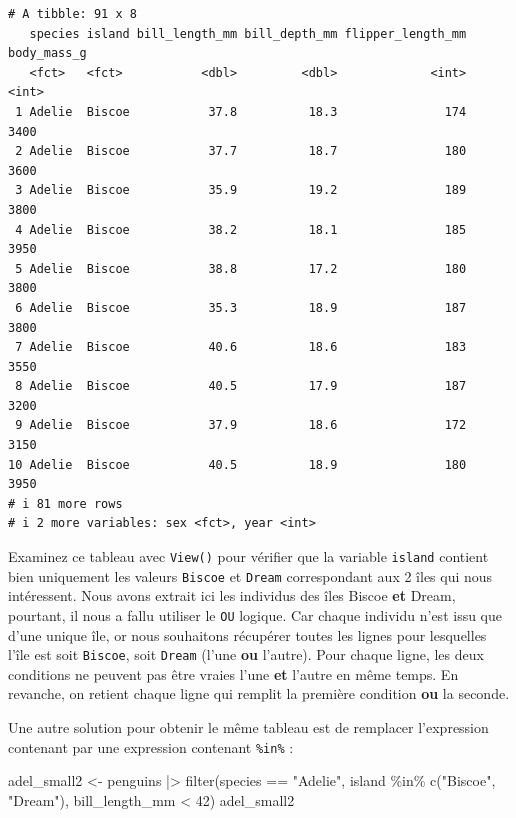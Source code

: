 \documentclass[
  a4paper,
  DIV=11,
  numbers=noendperiod,
  oneside]{scrreprt}
\newenvironment{Shaded}{}{}
\newcommand{\DecValTok}[1]{\textcolor[rgb]{0.00,0.36,0.77}{#1}}
\newcommand{\FunctionTok}[1]{\textcolor[rgb]{0.44,0.26,0.76}{#1}}
\newcommand{\NormalTok}[1]{\textcolor[rgb]{0.14,0.16,0.18}{#1}}
\newcommand{\OtherTok}[1]{\textcolor[rgb]{0.44,0.26,0.76}{#1}}
\newcommand{\SpecialCharTok}[1]{\textcolor[rgb]{0.00,0.36,0.77}{#1}}
\newcommand{\StringTok}[1]{\textcolor[rgb]{0.01,0.18,0.38}{#1}}
\begin{document}
\begin{verbatim}
# A tibble: 91 x 8
   species island bill_length_mm bill_depth_mm flipper_length_mm body_mass_g
   <fct>   <fct>           <dbl>         <dbl>             <int>       <int>
 1 Adelie  Biscoe           37.8          18.3               174        3400
 2 Adelie  Biscoe           37.7          18.7               180        3600
 3 Adelie  Biscoe           35.9          19.2               189        3800
 4 Adelie  Biscoe           38.2          18.1               185        3950
 5 Adelie  Biscoe           38.8          17.2               180        3800
 6 Adelie  Biscoe           35.3          18.9               187        3800
 7 Adelie  Biscoe           40.6          18.6               183        3550
 8 Adelie  Biscoe           40.5          17.9               187        3200
 9 Adelie  Biscoe           37.9          18.6               172        3150
10 Adelie  Biscoe           40.5          18.9               180        3950
# i 81 more rows
# i 2 more variables: sex <fct>, year <int>
\end{verbatim}

Examinez ce tableau avec \texttt{View()} pour vérifier que la variable
\texttt{island} contient bien uniquement les valeurs \texttt{Biscoe} et
\texttt{Dream} correspondant aux 2 îles qui nous intéressent. Nous avons
extrait ici les individus des îles Biscoe \textbf{et} Dream, pourtant,
il nous a fallu utiliser le \texttt{OU} logique. Car chaque individu
n'est issu que d'une unique île, or nous souhaitons récupérer toutes les
lignes pour lesquelles l'île est soit \texttt{Biscoe}, soit
\texttt{Dream} (l'une \textbf{ou} l'autre). Pour chaque ligne, les deux
conditions ne peuvent pas être vraies l'une \textbf{et} l'autre en même
temps. En revanche, on retient chaque ligne qui remplit la première
condition \textbf{ou} la seconde.

Une autre solution pour obtenir le même tableau est de remplacer
l'expression contenant \texttt{\textbar{}} par une expression contenant
\texttt{\%in\%} :

\begin{Shaded}
\begin{Highlighting}[]
\NormalTok{adel\_small2 }\OtherTok{\textless{}{-}}\NormalTok{ penguins }\SpecialCharTok{|\textgreater{}} 
  \FunctionTok{filter}\NormalTok{(species }\SpecialCharTok{==} \StringTok{"Adelie"}\NormalTok{, }
\NormalTok{         island }\SpecialCharTok{\%in\%} \FunctionTok{c}\NormalTok{(}\StringTok{"Biscoe"}\NormalTok{, }\StringTok{"Dream"}\NormalTok{), }
\NormalTok{         bill\_length\_mm }\SpecialCharTok{\textless{}} \DecValTok{42}\NormalTok{)}
\NormalTok{adel\_small2}
\end{Highlighting}
\end{Shaded}
\end{document}
